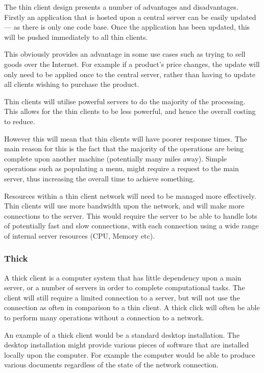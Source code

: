 The thin client design presents a number of advantages and disadvantages. 
Firstly an application that is hosted upon a central server can be easily 
updated --- as there is only one code base. Once the application has been 
updated, this will be pushed immediately to all thin clients.

This obviously provides an advantage in some use cases such as trying to sell 
goods over the Internet. For example if a product's price changes, the update 
will only need to be applied once to the central server, rather than having to 
update all clients wishing to purchase the product.

Thin clients will utilise powerful servers to do the majority of the 
processing. This allows for the thin clients to be less powerful, and hence the
overall costing to reduce.

However this will mean that thin clients will have poorer response times. The 
main reason for this is the fact that the majority of the operations are being 
complete upon another machine (potentially many miles away). Simple operations 
such as populating a menu, might require a request to the main server, thus 
increasing the overall time to achieve something.

Resources within a thin client network will need to be managed more 
effectively. Thin clients will use more bandwidth upon the network, and will 
make more connections to the server. This would require the server to be able 
to handle lots of potentially fast and slow connections, with each connection 
using a wide range of internal server resources (CPU, Memory etc). 


\subsubsection{Thick}
A thick client is a computer system that has little dependency upon a main 
server, or a number of servers in order to complete computational tasks. The 
client will still require a limited connection to a server, but will not use 
the connection as often in comparison to a thin client. A thick click will 
often be able to perform many operations without a connection to a network.

An example of a thick client would be a standard desktop installation. The 
desktop installation might provide various pieces of software that are 
installed locally upon the computer. For example the computer would be able to 
produce various documents regardless of the state of the network connection.

